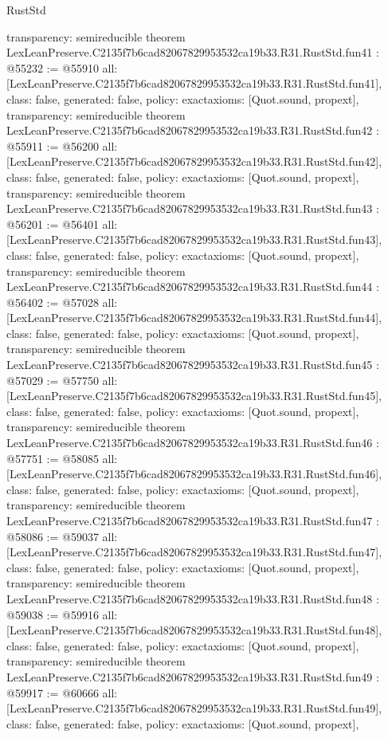 \begin{lexlean}{RustStd}
\begin{coremodule}
{  transparency: semireducible
}
theorem LexLeanPreserve.C2135f7b6cad82067829953532ca19b33.R31.RustStd.fun41 : @55232 := @55910 {
  all: [LexLeanPreserve.C2135f7b6cad82067829953532ca19b33.R31.RustStd.fun41],
  class: false,
  generated: false,
  policy: exact{axioms: [Quot.sound, propext]},
  transparency: semireducible
}
theorem LexLeanPreserve.C2135f7b6cad82067829953532ca19b33.R31.RustStd.fun42 : @55911 := @56200 {
  all: [LexLeanPreserve.C2135f7b6cad82067829953532ca19b33.R31.RustStd.fun42],
  class: false,
  generated: false,
  policy: exact{axioms: [Quot.sound, propext]},
  transparency: semireducible
}
theorem LexLeanPreserve.C2135f7b6cad82067829953532ca19b33.R31.RustStd.fun43 : @56201 := @56401 {
  all: [LexLeanPreserve.C2135f7b6cad82067829953532ca19b33.R31.RustStd.fun43],
  class: false,
  generated: false,
  policy: exact{axioms: [Quot.sound, propext]},
  transparency: semireducible
}
theorem LexLeanPreserve.C2135f7b6cad82067829953532ca19b33.R31.RustStd.fun44 : @56402 := @57028 {
  all: [LexLeanPreserve.C2135f7b6cad82067829953532ca19b33.R31.RustStd.fun44],
  class: false,
  generated: false,
  policy: exact{axioms: [Quot.sound, propext]},
  transparency: semireducible
}
theorem LexLeanPreserve.C2135f7b6cad82067829953532ca19b33.R31.RustStd.fun45 : @57029 := @57750 {
  all: [LexLeanPreserve.C2135f7b6cad82067829953532ca19b33.R31.RustStd.fun45],
  class: false,
  generated: false,
  policy: exact{axioms: [Quot.sound, propext]},
  transparency: semireducible
}
theorem LexLeanPreserve.C2135f7b6cad82067829953532ca19b33.R31.RustStd.fun46 : @57751 := @58085 {
  all: [LexLeanPreserve.C2135f7b6cad82067829953532ca19b33.R31.RustStd.fun46],
  class: false,
  generated: false,
  policy: exact{axioms: [Quot.sound, propext]},
  transparency: semireducible
}
theorem LexLeanPreserve.C2135f7b6cad82067829953532ca19b33.R31.RustStd.fun47 : @58086 := @59037 {
  all: [LexLeanPreserve.C2135f7b6cad82067829953532ca19b33.R31.RustStd.fun47],
  class: false,
  generated: false,
  policy: exact{axioms: [Quot.sound, propext]},
  transparency: semireducible
}
theorem LexLeanPreserve.C2135f7b6cad82067829953532ca19b33.R31.RustStd.fun48 : @59038 := @59916 {
  all: [LexLeanPreserve.C2135f7b6cad82067829953532ca19b33.R31.RustStd.fun48],
  class: false,
  generated: false,
  policy: exact{axioms: [Quot.sound, propext]},
  transparency: semireducible
}
theorem LexLeanPreserve.C2135f7b6cad82067829953532ca19b33.R31.RustStd.fun49 : @59917 := @60666 {
  all: [LexLeanPreserve.C2135f7b6cad82067829953532ca19b33.R31.RustStd.fun49],
  class: false,
  generated: false,
  policy: exact{axioms: [Quot.sound, propext]},
}
\end{coremodule}
\end{lexlean}
